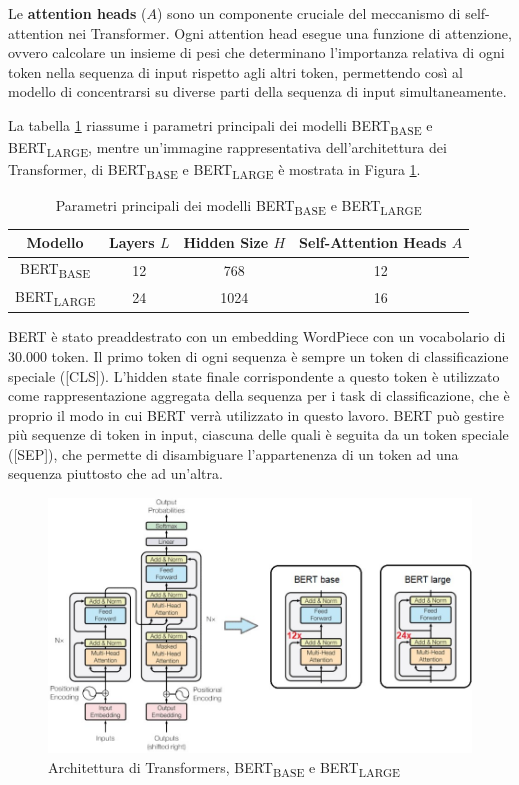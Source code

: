 \documentclass[../../Thesis.tex]{subfiles}
\begin{document}
Le \textbf{attention heads} ($A$) sono un componente cruciale del meccanismo di self-attention nei Transformer. Ogni attention head esegue una funzione di attenzione, ovvero calcolare un insieme di pesi che determinano l'importanza relativa di ogni token nella sequenza di input rispetto agli altri token, permettendo così al modello di concentrarsi su diverse parti della sequenza di input simultaneamente. 

La tabella \ref{tab:bert_params} riassume i parametri principali dei modelli BERT\textsubscript{BASE} e BERT\textsubscript{LARGE}, mentre un'immagine rappresentativa dell'architettura dei Transformer, di BERT\textsubscript{BASE} e BERT\textsubscript{LARGE} è mostrata in Figura \ref{fig:bert_input}.
\begin{table}[h]
    \centering
    \begin{tabular}{|c|c|c|c|}
        \hline
        Modello & Layers $L$ & Hidden Size $H$ & Self-Attention Heads $A$ \\
        \hline
        BERT\textsubscript{BASE} & 12 & 768 & 12 \\
        \hline
        BERT\textsubscript{LARGE} & 24 & 1024 & 16 \\
        \hline
    \end{tabular}
    \caption{Parametri principali dei modelli BERT\textsubscript{BASE} e BERT\textsubscript{LARGE}}
    \label{tab:bert_params}
\end{table}
\label{sec:bert}

BERT è stato preaddestrato con un embedding WordPiece \cite{WordPiece} con un vocabolario di 30.000 token. Il primo token di ogni sequenza è sempre un token di classificazione speciale ([CLS]). L'hidden state finale corrispondente a questo token è utilizzato come rappresentazione aggregata della sequenza per i task di classificazione, che è proprio il modo in cui BERT verrà utilizzato in questo lavoro. BERT può gestire più sequenze di token in input, ciascuna delle quali è seguita da un token speciale ([SEP]), che permette di disambiguare l'appartenenza di un token ad una sequenza piuttosto che ad un'altra. 

\begin{figure}[H]
    \centering
    \includegraphics[width=\textwidth]{../../img/bert_base_large.jpg}
    \caption{Architettura di Transformers, BERT\textsubscript{BASE} e BERT\textsubscript{LARGE}}
    \label{fig:bert_input}
\end{figure}
\end{document}
